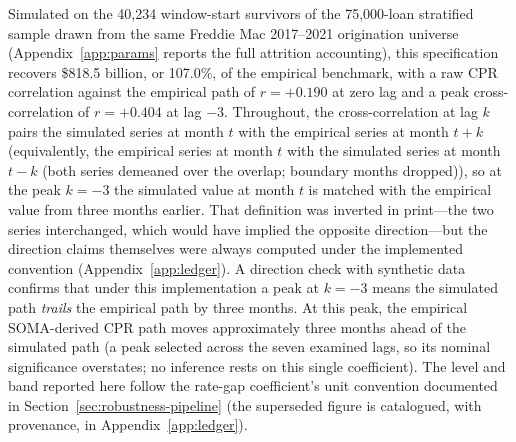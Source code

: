 \documentclass[12pt]{article}
\begin{document}
Simulated on the 40,234 window-start survivors of the 75,000-loan stratified sample drawn from the same Freddie Mac 2017--2021 origination universe (Appendix~\ref{app:params} reports the full attrition accounting), this specification recovers \$818.5 billion, or 107.0\%, of the empirical benchmark, with a raw CPR correlation against the empirical path of $r = +0.190$ at zero lag and a peak cross-correlation of $r = +0.404$ at lag $-3$. Throughout, the cross-correlation at lag $k$ pairs the simulated series at month $t$ with the empirical series at month $t+k$ (equivalently, the empirical series at month $t$ with the simulated series at month $t-k$ (both series demeaned over the overlap; boundary months dropped)), so at the peak $k=-3$ the simulated value at month $t$ is matched with the empirical value from three months earlier. That definition was inverted in print---the two series interchanged, which would have implied the opposite direction---but the direction claims themselves were always computed under the implemented convention (Appendix~\ref{app:ledger}). A direction check with synthetic data confirms that under this implementation a peak at $k=-3$ means the simulated path \emph{trails} the empirical path by three months. At this peak, the empirical SOMA-derived CPR path moves approximately three months ahead of the simulated path (a peak selected across the seven examined lags, so its nominal significance overstates; no inference rests on this single coefficient). The level and band reported here follow the rate-gap coefficient's unit convention documented in Section~\ref{sec:robustness-pipeline} (the superseded figure is catalogued, with provenance, in Appendix~\ref{app:ledger}).
\end{document}
